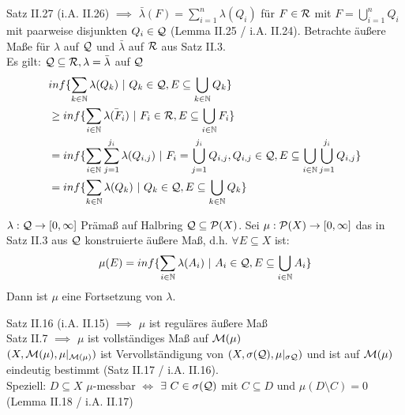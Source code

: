 \documentclass[11pt,a4paper,fleqn,openany]{report}
\begin{document}
    
    \begin{remark}
      Satz II.27 (i.A. II.26) $\implies$ $\bar{\lambda}(F) = \sum\limits_{i=1}^n \lambda(Q_i)$ für $F \in \mathcal{R}$ mit $F=\bigcup\limits_{i=1}^n Q_i$ mit paarweise disjunkten $Q_i \in \mathcal{Q}$ (Lemma II.25 / i.A. II.24). Betrachte äußere Maße für $\lambda$ auf $\mathcal{Q}$ und $\bar{\lambda}$ auf $\mathcal{R}$ aus Satz II.3.\\
      Es gilt: $\mathcal{Q} \subseteq \mathcal{R}, \lambda = \bar{\lambda}$ auf $\mathcal{Q}$
      \begin{align*}
        & inf\{\sum\limits_{k \in \mathbb{N}} \lambda(Q_k) \ | \ Q_k \in \script{Q}, E \subseteq \bigcup\limits_{k \in \mathbb{N}} Q_k\}\\
        &\geq inf\{\sum\limits_{i \in \mathbb{N}} \bar{\lambda(F_i)} \ | \ F_i \in \script{R}, E \subseteq \bigcup\limits_{i \in \mathbb{N}} F_i\}\\
        &= inf\{ \sum\limits_{i \in \mathbb{N}} \sum\limits_{j=1}^{j_i} \lambda(Q_{i,j}) \ | \ F_i = \bigcup\limits_{j=1}^{j_i} Q_{i,j}, Q_{i,j} \in \script{Q}, E \subseteq \bigcup\limits_{i \in \mathbb{N}} \bigcup\limits_{j=1}^{j_i} Q_{i,j}\}\\
        &= inf\{\sum\limits_{k \in \mathbb{N}} \lambda(Q_k) \ | \ Q_k \in \script{Q}, E \subseteq \bigcup\limits_{k \in \mathbb{N}} Q_k\}
      \end{align*}
    \end{remark}

    \begin{theorem}[(i.A. II.30)]
      $\lambda: \mathcal{Q} \to [0, \infty]$ Prämaß auf Halbring $\mathcal{Q} \subseteq \mathcal{P}(X)$. Sei $\mu:\mathcal{P}(X) \to [0,\infty]$ das in Satz II.3 aus $\mathcal{Q}$ konstruierte äußere Maß, d.h. $\forall E \subseteq X$ ist:
      \begin{align*}
        \mu(E) = inf\{\sum\limits_{i \in \mathbb{N}} \lambda(A_i) \ | \ A_i \in \script{Q}, E \subseteq \bigcup\limits_{i \in \mathbb{N}}A_i \}
      \end{align*}
      Dann ist $\mu$ eine Fortsetzung von $\lambda$.
    \end{theorem}

    \begin{remark}
      Satz II.16 (i.A. II.15) $\implies$ $\mu$ ist reguläres äußere Maß\\
      Satz II.7 $\implies$ $\mu$ ist vollständiges Maß auf $\mathcal{M}(\mu)$\\
      $(X, \mathcal{M}(\mu), \mu|_{\mathcal{M}(\mu)})$ ist Vervollständigung von $(X, \sigma(\mathcal{Q}), \mu|_{\sigma{\mathcal{Q}}})$ und ist auf $\mathcal{M}(\mu)$ eindeutig bestimmt (Satz II.17 / i.A. II.16).\\
      Speziell: $D \subseteq X$ $\mu$-messbar $\Leftrightarrow$ $\exists \ C \in \sigma(\mathcal{Q})$ mit $C \subseteq D$ und $\mu(D \setminus C) = 0$ (Lemma II.18 / i.A. II.17)
    \end{remark}
\end{document}
